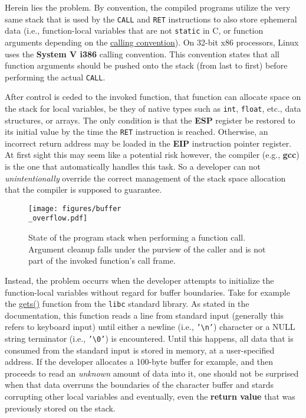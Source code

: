 Herein lies the problem. By convention, the compiled programs utilize the very
same stack that is used by the \texttt{CALL} and \texttt{RET} instructions to
also store ephemeral data (i.e., function-local variables that are not
\texttt{static} in C, or function arguments depending on the
\href{https://wiki.osdev.org/Calling_Conventions}{calling convention}). On
32-bit x86 processors, Linux uses the \textbf{System V i386} calling convention.
This convention states that all function arguments should be pushed onto the
stack (from last to first) before performing the actual \texttt{CALL}.

After control is ceded to the invoked function, that function can allocate space
on the stack for local variables, be they of native types such as \texttt{int},
\texttt{float}, etc., data structures, or arrays. The only condition is that
the \textbf{ESP} register be restored to its initial value by the time the
\texttt{RET} instruction is reached. Otherwise, an incorrect return address may
be loaded in the \textbf{EIP} instruction pointer register. At first sight this
may seem like a potential risk however, the compiler (e.g., \textbf{gcc}) is the
one that automatically handles this task. So a developer can not
\textit{unintentionally} override the correct management of the stack space
allocation that the compiler is supposed to guarantee.

\begin{wrapfigure}{l}{0.6 \textwidth}
    \centering
    \texttt{[image: figures/buffer\\\_overflow.pdf]}
    \caption{State of the program stack when performing a function call.
             Argument cleanup falls under the purview of the caller and is not
             part of the invoked function's call frame.}
    \label{fig:call-stack}
\end{wrapfigure}

Instead, the problem occurrs when the developer attempts to initialize the
function-local variables without regard for buffer boundaries. Take for example
the \href{https://www.man7.org/linux/man-pages/man3/gets.3.html}{gets()}
function from the \texttt{libc} standard library. As stated in the documentation,
this function reads a line from standard input (generally this refers to
keyboard input) until either a newline (i.e., \texttt{'\textbackslash n'})
character or a NULL string terminator (i.e., \texttt{'\textbackslash 0'}) is
encountered. Until this happens, all data that is consumed from the standard
input is stored in memory, at a user-specified address. If the developer
allocates a 100-byte buffer for example, and then proceeds to read an
\textit{unknown} amount of data into it, one should not be surprised when that
data overruns the boundaries of the character buffer and stards corrupting other
local variables and eventually, even the \textbf{return value} that was
previously stored on the stack.

